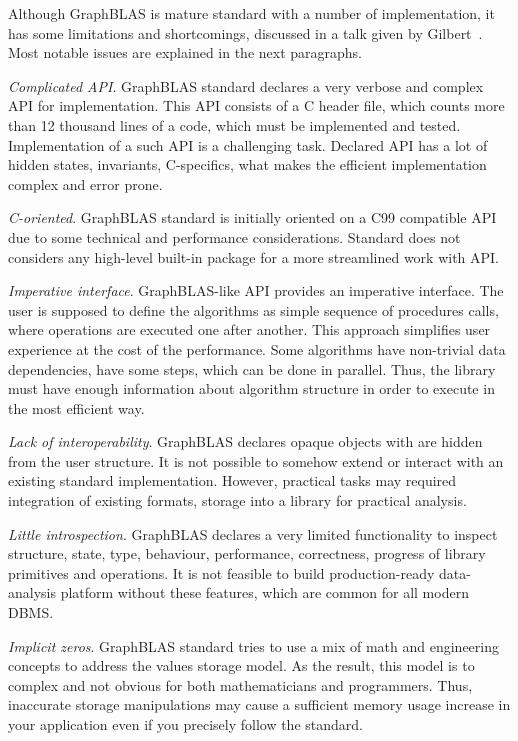 Although GraphBLAS is mature standard with a number of implementation, it has some limitations and shortcomings, discussed in a talk given by Gilbert~\cite{talk:graphblas_did_wrong}. Most notable issues are explained in the next paragraphs. 
 
\textit{Complicated API}. GraphBLAS standard declares a very verbose and complex API for implementation. This API consists of a C header file, which counts more than 12 thousand lines of a code, which must be implemented and tested. Implementation of a such API is a challenging task. Declared API has a lot of hidden states, invariants, C-specifics, what makes the efficient implementation complex and error prone.

\textit{C-oriented}. GraphBLAS standard is initially oriented on a C99 compatible API due to some technical and performance considerations. Standard does not considers any high-level built-in package for a more streamlined work with API.

\textit{Imperative interface}. GraphBLAS-like API provides an imperative interface. The user is supposed to define the algorithms as simple sequence of procedures calls, where operations are executed one after another. This approach simplifies user experience at the cost of the performance. Some algorithms have non-trivial data dependencies, have some steps, which can be done in parallel. Thus, the library must have enough information about algorithm structure in order to execute in the most efficient way.

\textit{Lack of interoperability}. GraphBLAS declares opaque objects with are hidden from the user structure. It is not possible to somehow extend or interact with an existing standard implementation. However, practical tasks may required integration of existing formats, storage into a library for practical analysis. 

\textit{Little introspection}. GraphBLAS declares a very limited functionality to inspect structure, state, type, behaviour, performance, correctness, progress of library primitives and operations. It is not feasible to build production-ready data-analysis platform without these features, which are common for all modern DBMS.

\textit{Implicit zeros}. GraphBLAS standard tries to use a mix of math and engineering concepts to address the values storage model. As the result, this model is to complex and not obvious for both mathematicians and programmers. Thus, inaccurate storage manipulations may cause a sufficient memory usage increase in your application even if you precisely follow the standard.


